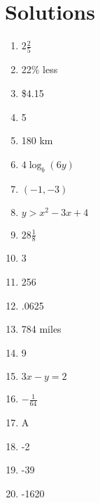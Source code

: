 \documentclass[../uilmath.tex]{subfiles}
\begin{document}
\section*{Solutions}
\begin{enumerate}[label=\bfseries\arabic*.]
    \item %
    $2 \frac{2}{5}$

    \item %
    22\% less

    \item %
    \$4.15 

    \item %
    5

    \item %
    180 km

    \item %
    $4\log_b (6y)$

    \item %
    $(-1,-3)$

    \item %
    $y>x^2-3x+4$

    \item %
    $28 \frac{1}{8}$

    \item %
    3

    \item %
    256 

    \item %
    .0625 

    \item %
    784 miles 

    \item %
    9 

    \item %
    $3x-y=2$

    \item %
    $-\frac{1}{64}$

    \item %
    A 

    \item %
    -2 

    \item %
    -39 

    \item %
    -1620 


\end{enumerate}
\end{document}
